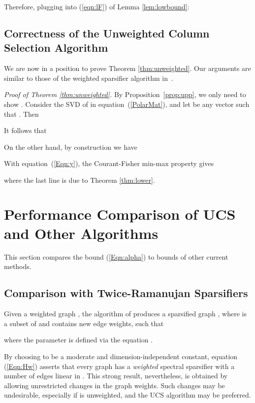 \documentclass[final,leqno,onefignum,onetabnum]{siamltex1213}
\begin{document}
Therefore, plugging  into (\ref{eqn:lF}) of Lemma \ref{lem:lowbound}: 



\subsection{Correctness of the Unweighted Column Selection Algorithm}\label{sec:33}

We are now in a position to prove Theorem \ref{thm:unweighted}. Our
arguments are similar to those of the weighted sparsifier algorithm in~\cite{ramanujansparse}.

{\em Proof of Theorem \ref{thm:unweighted}.} By
Proposition~\ref{prop:upp}, we only need to show . Consider the SVD of  in equation~(\ref{PolarMat}), and let  be any vector such that . Then 


 
It follows that 
 
On the other hand, by construction we have 

With equation~(\ref{Eqn:y}), the Courant-Fisher min-max property gives

where the last line is due to Theorem \ref{thm:lower}.
\hspace{2 em}\endproof

\section{Performance Comparison of UCS and Other Algorithms}
This section compares the bound (\ref{Eqn:alpha}) to bounds of other current methods.  

\subsection{Comparison with Twice-Ramanujan Sparsifiers}
Given a weighted graph , the algorithm of \cite{ramanujansparse} produces a sparsified graph , where  is a subset of  and  contains new edge weights, such that 

where the parameter  is defined via the equation . 

By choosing  to be a moderate and dimension-independent constant,
equation (\ref{Eqn:Hw}) asserts that every graph  has a \emph{weighted} spectral sparsifier with a number of
edges linear in . This strong result, nevertheless, is obtained by
allowing unrestricted changes in the graph weights.  Such changes may be undesirable, especially if  is unweighted, and the UCS algorithm may be preferred.
\end{document}
